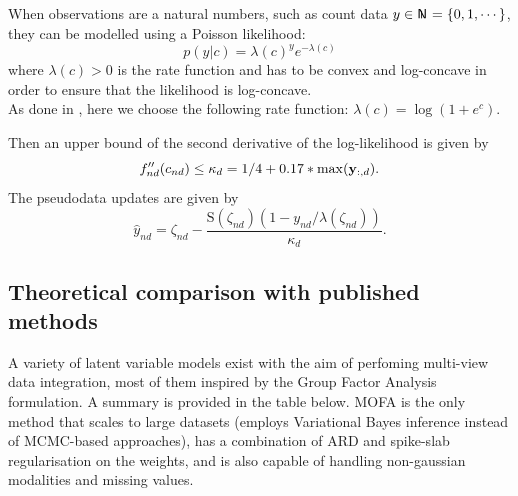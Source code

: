 When observations are a natural numbers, such as count data $y \in \N = \{0,1,\cdots\}$, they can be modelled using a Poisson likelihood:
\begin{equation*}
	p(y|c) = \lambda(c)^y e^{-\lambda(c)}
\end{equation*}
where $\lambda(c)>0$ is the rate function and has to be convex and log-concave in order to ensure that the likelihood is log-concave.\\
As done in \cite{Seeger2012}, here we choose the following rate function: $\lambda(c)=\log(1+e^c)$.

Then an upper bound of the second derivative of the log-likelihood is given by
\begin{equation*}
	f''_{nd}(c_{nd}) \leq \kappa_d = 1/4 + 0.17*\max({\bf y}_{:,d}).
\end{equation*}
The pseudodata updates are given by
\begin{equation*}
	\hat{y}_{nd} = \zeta_{nd} - \frac{\mathrm{S}(\zeta_{nd})(1-y_{nd}/\lambda(\zeta_{nd}))}{\kappa_d}.
\end{equation*}

\pagebreak
	 
\subsection{Theoretical comparison with published methods}

A variety of latent variable models exist with the aim of perfoming multi-view data integration, most of them inspired by the Group Factor Analysis formulation. A summary is provided in the table below. MOFA is the only method that scales to large datasets (employs Variational Bayes inference instead of MCMC-based approaches), has a combination of ARD and spike-slab regularisation on the weights, and is also capable of handling non-gaussian modalities and missing values.


